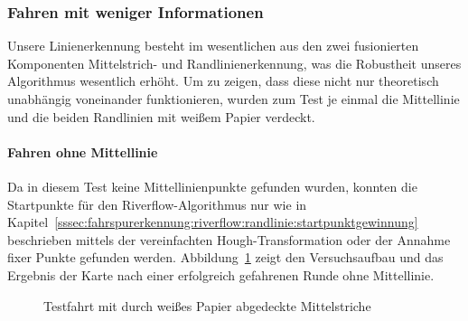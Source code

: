 \subsubsection{Fahren mit weniger Informationen \dcfirstauthorshort}

Unsere Linienerkennung besteht im wesentlichen aus den zwei fusionierten Komponenten Mittelstrich- und Randlinienerkennung, was die Robustheit unseres Algorithmus wesentlich erhöht. Um zu zeigen, dass diese nicht nur theoretisch unabhängig voneinander funktionieren, wurden zum Test je einmal die Mittellinie und die beiden Randlinien mit weißem Papier verdeckt. 


\paragraph{Fahren ohne Mittellinie}
Da in diesem Test keine Mittellinienpunkte gefunden wurden, konnten die Startpunkte für den Riverflow-Algorithmus nur wie in Kapitel~\ref{sssec:fahrspurerkennung:riverflow:randlinie:startpunktgewinnung} beschrieben mittels der vereinfachten Hough-Transformation oder der Annahme fixer Punkte gefunden werden. Abbildung~\ref{fig:evaluation:riverflow:ohneMittellinie} zeigt den Versuchsaufbau und das Ergebnis der Karte nach einer erfolgreich gefahrenen Runde ohne Mittellinie.

\begin{figure}[htbp] %
	\hfill
	\label{fig:evaluation:riverflow:ohneMittellinie}
	\caption{Testfahrt mit durch weißes Papier abgedeckte Mittelstriche}
\end{figure}

